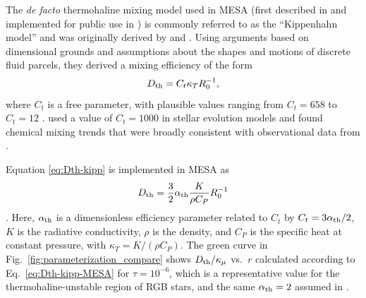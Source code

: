 The \textit{de facto} thermohaline mixing model used in MESA (first described in \citealt{CantielloLanger2010} and implemented for public use in \citealt{mesa2}) is commonly referred to as the ``Kippenhahn model'' and was originally derived by \citet{Ulrich1972} and \citet{kippenhahn_etal_1980}.
Using arguments based on dimensional grounds and assumptions about the shapes and motions of discrete fluid parcels, they derived a mixing efficiency of the form
\begin{equation} \label{eq:Dth-kipp}
    \Dth = C_t \kappa_T R_0^{-1},
\end{equation}
\citep[see Eq.~(5) of][]{charbonnel_thermohaline_2007}
where $C_t$ is a free parameter, with plausible values ranging from $C_t = 658$ \citep{Ulrich1972} to $C_t = 12$ \citep{kippenhahn_etal_1980}. 
\citet{charbonnel_thermohaline_2007} used a value of $C_t = 1000$ in stellar evolution models and found chemical mixing trends that were broadly consistent with observational data from \citet{Gratton2000}.

Equation \eqref{eq:Dth-kipp} is implemented in MESA as
\begin{equation} \label{eq:Dth-kipp-MESA}
    \Dth = \frac{3}{2} \alpha_{\rm{th}} \frac{K}{\rho C_P}R_0^{-1}
\end{equation}
\citep[see Eq.~(14) of][]{mesa2}. 
Here, $\alpha_{\rm{th}}$ is a dimensionless efficiency parameter related to $C_t$ by $C_t = 3\alpha_{\rm{th}}/2$, $K$ is the radiative conductivity, $\rho$ is the density, and $C_P$ is the specific heat at constant pressure, with $\kappa_T = K/(\rho C_P)$. 
The green curve in Fig.~\ref{fig:parameterization_compare} shows $D_\mathrm{th}/\kappa_\mu$ vs.~$r$ calculated according to Eq.~\eqref{eq:Dth-kipp-MESA} for $\tau = 10^{-6}$, which is a representative value for the thermohaline-unstable region of RGB stars, and the same $\alpha_{\rm{th}} = 2$ assumed in \citet{CantielloLanger}.


